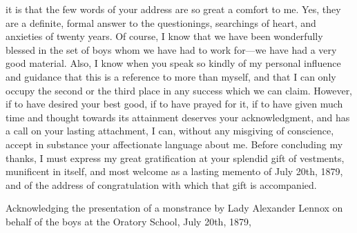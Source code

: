 it is that the few words of your address are so great a comfort to me.
Yes, they are a definite, formal answer to the questionings,
searchings of heart, and anxieties of twenty years. Of course, I know
that we have been wonderfully blessed in the set of boys whom we have
had to work for—we have had a very good material. Also, I know when
you speak so kindly of my personal influence and guidance that this is
a reference to more than myself, and that I can only occupy the second
or the third place in any success which we can claim. However, if to
have desired your best good, if to have prayed for it, if to have
given much time and thought towards its attainment deserves your
acknowledgment, and has a call on your lasting attachment, I can,
without any misgiving of conscience, accept in substance your
affectionate language about me. Before concluding my thanks, I must
express my great gratification at your splendid gift of vestments,
munificent in itself, and most welcome as a lasting memento of July
20th, 1879, and of the address of congratulation with which that gift
is accompanied.


Acknowledging the presentation of a monstrance by
Lady Alexander Lennox on behalf of the boys at the Oratory School,
July 20th, 1879,

